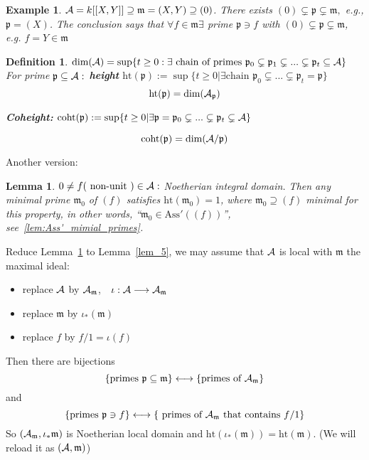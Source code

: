 \documentclass[11pt]{article}
\newtheorem{lemma}[thm]{Lemma}
\newtheorem{dfn}[thm]{Definition}
\newtheorem{ex}[thm]{Example}
\newcommand{\scm}{{\mathfrak m}}
\newcommand{\scp}{{\mathfrak p}}
\newcommand{\cala}{{\cal A}}
\newcommand{\lrta}{\longrightarrow}
\newcommand{\llrta}{\longleftrightarrow}
\begin{document}
\begin{ex}
$\cala=k[[X,Y]]\supseteq \scm=(X,Y)\supseteq (0)$. There exists $(0)\subsetneq\scp\subsetneq\scm,$ e.g., $\scp=(X)$. The conclusion says that $\forall f\in\scm\exists $ prime $\scp\ni f$ with  $(0)\subsetneq \scp\subsetneq \scm$, e.g. $f=Y\in\scm$
\end{ex}




\begin{dfn}
$\text{dim}(\cala)=\sup \{t\geq 0:\exists \text{ chain of primes $\scp_0\subsetneq \scp_1\subsetneq ...\subsetneq \scp_t\subseteq \cala$}\}$\\

For prime $\scp\subseteq \cala:$ \textbf{ height }$\text{ht}(\scp):=\sup \{t\geq 0|\exists\text{chain $\scp_0\subsetneq ...\subsetneq \scp_t=\scp$}\}$
$$
\text{ht}(\scp)=\text{dim}(\cala_\scp)
$$

\textbf{Coheight:} $\text{coht}(\scp):=\sup\{t\geq 0|\exists \scp=\scp_0\subsetneq ...\subsetneq \scp_t\subsetneq \cala\}$

$$
\text{coht}(\scp)=\text{dim}(\cala/\scp)
$$
\end{dfn}
 
Another version:
\begin{lemma}\label{lem_5'}
$0\neq f(\text{ non-unit })\in\cala:$ Noetherian integral domain. Then any minimal prime $\scm_0$ of $(f)$ satisfies $\text{ht}(\scm_0)= 1$, where
$\scm_0\supseteq (f)$ minimal for this property, in other words, ``$\scm_0\in \text{Ass}'((f))$'', see~\ref{lem:Ass'_mimial_primes}.
\end{lemma}

Reduce Lemma~\ref{lem_5'} to Lemma~\ref{lem_5}, we may assume that $\cala$ is local with $\scm$ the maximal ideal:
\begin{itemize}
\item replace $\cala$ by $\cala_{\scm}$,\ \  $\iota:\cala\lrta \cala_{\scm}$
\item replace $\scm$ by $\iota_*(\scm)$
\item replace $f$ by $f/1=\iota(f)$
\end{itemize}

Then there are bijections 
$$
\{\text{primes $\scp\subseteq \scm$}\}\llrta \text{\{primes of $\cala_{\scm}$\}}
$$
and  
$$
\{\text{primes $\scp\ni f$}\} \llrta\{\text{ primes of }\cala_{\scm}\text{ that contains } f/1\}
$$
So $(\cala_\scm,\iota_*\scm)$ is Noetherian local domain and $\text{ht}(\iota_*(\scm))=\text{ht}(\scm)$. (We will reload it as $(\cala,\scm)$)
\end{document}

